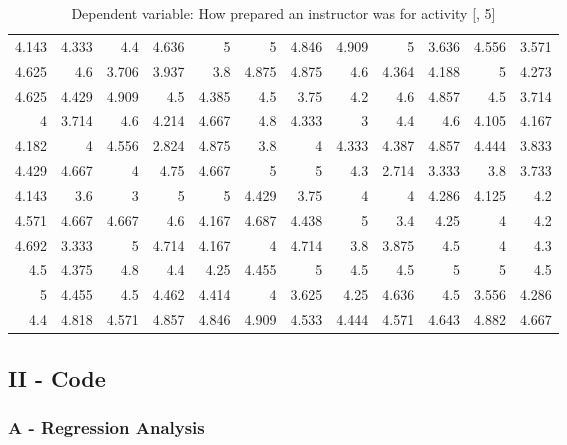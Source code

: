 \documentclass[10pt]{report}
\begin{document}
\begin{table}[!htbp]
\begin{tabular}{rrrrrrrrrrrr}
	4.143 & 4.333 & 4.4   & 4.636 & 5     & 5     & 4.846 & 4.909 & 5     & 3.636 & 4.556 & 3.571 \\
	4.625 & 4.6   & 3.706 & 3.937 & 3.8   & 4.875 & 4.875 & 4.6   & 4.364 & 4.188 & 5     & 4.273 \\
	4.625 & 4.429 & 4.909 & 4.5   & 4.385 & 4.5   & 3.75  & 4.2   & 4.6   & 4.857 & 4.5   & 3.714 \\
	4     & 3.714 & 4.6   & 4.214 & 4.667 & 4.8   & 4.333 & 3     & 4.4   & 4.6   & 4.105 & 4.167 \\
	4.182 & 4     & 4.556 & 2.824 & 4.875 & 3.8   & 4     & 4.333 & 4.387 & 4.857 & 4.444 & 3.833 \\
	4.429 & 4.667 & 4     & 4.75  & 4.667 & 5     & 5     & 4.3   & 2.714 & 3.333 & 3.8   & 3.733 \\
	4.143 & 3.6   & 3     & 5     & 5     & 4.429 & 3.75  & 4     & 4     & 4.286 & 4.125 & 4.2   \\
	4.571 & 4.667 & 4.667 & 4.6   & 4.167 & 4.687 & 4.438 & 5     & 3.4   & 4.25  & 4     & 4.2   \\
	4.692 & 3.333 & 5     & 4.714 & 4.167 & 4     & 4.714 & 3.8   & 3.875 & 4.5   & 4     & 4.3   \\
	4.5   & 4.375 & 4.8   & 4.4   & 4.25  & 4.455 & 5     & 4.5   & 4.5   & 5     & 5     & 4.5   \\
	5     & 4.455 & 4.5   & 4.462 & 4.414 & 4     & 3.625 & 4.25  & 4.636 & 4.5   & 3.556 & 4.286 \\
	4.4   & 4.818 & 4.571 & 4.857 & 4.846 & 4.909 & 4.533 & 4.444 & 4.571 & 4.643 & 4.882 & 4.667 \\
	\hline
	\end{tabular}

    \caption{Dependent variable: How prepared an instructor was for activity [, 5]}
\end{table}

\newpage




\subsection*{II - Code}


\subsubsection*{A - Regression Analysis}
\end{document}
